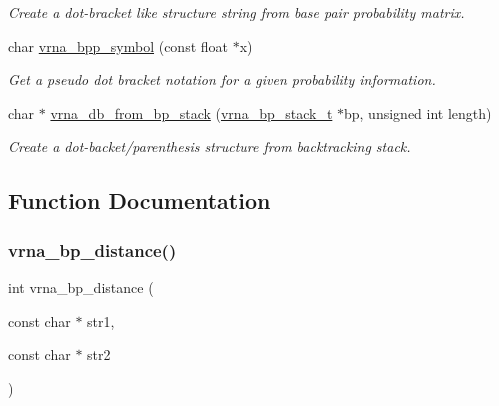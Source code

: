 \begin{DoxyCompactItemize}
\begin{DoxyCompactList}\small\item\em Create a dot-\/bracket like structure string from base pair probability matrix. \end{DoxyCompactList}\item 
\mbox{\label{group__struct__utils_ga025bff1b27fa46534c8fae6980f64bb5}} 
char \mbox{\hyperlink{group__struct__utils_ga025bff1b27fa46534c8fae6980f64bb5}{vrna\+\_\+bpp\+\_\+symbol}} (const float $\ast$x)
\begin{DoxyCompactList}\small\item\em Get a pseudo dot bracket notation for a given probability information. \end{DoxyCompactList}\item 
char $\ast$ \mbox{\hyperlink{group__struct__utils_ga27bea2c241564af53a065982183389df}{vrna\+\_\+db\+\_\+from\+\_\+bp\+\_\+stack}} (\mbox{\hyperlink{group__data__structures_gaa651bda42e7692f08cb603cd6834b0ee}{vrna\+\_\+bp\+\_\+stack\+\_\+t}} $\ast$bp, unsigned int length)
\begin{DoxyCompactList}\small\item\em Create a dot-\/backet/parenthesis structure from backtracking stack. \end{DoxyCompactList}\end{DoxyCompactItemize}


\subsection{Function Documentation}
\mbox{\label{group__struct__utils_ga65bdfbac6a16bf30286e8a3f7d15f60a}} 
\subsubsection{\texorpdfstring{vrna\_bp\_distance()}{vrna\_bp\_distance()}}
{\footnotesize\ttfamily int vrna\+\_\+bp\+\_\+distance (\begin{DoxyParamCaption}\item[{const char $\ast$}]{str1,  }\item[{const char $\ast$}]{str2 }\end{DoxyParamCaption})}



